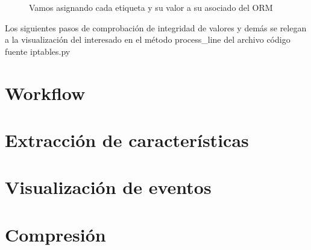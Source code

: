 \begin{figure}[H]

\caption{Vamos asignando cada etiqueta y su valor a su asociado del ORM}
\end{figure}

Los siguientes pasos de comprobación de integridad de valores y demás se relegan a la visualización del interesado en el método process\_line del archivo código fuente iptables.py\\

\pagebreak
\section{Workflow}

\section{Extracción de características}

\section{Visualización de eventos}

\section{Compresión}

